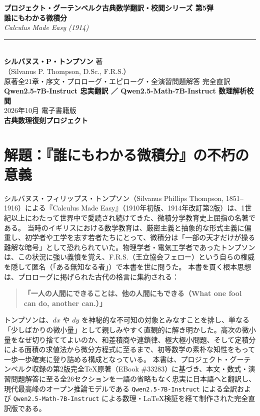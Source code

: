 \documentclass[a4paper,11pt,openany]{ltjsbook}
\begin{document}
\begin{titlepage}
    \centering
    \vspace*{25mm}
    {\fontsize{14}{20}\selectfont \textbf{プロジェクト・グーテンベルク古典数学翻訳・校閲シリーズ 第5弾}}\\[8mm]
    {\fontsize{28}{36}\selectfont \textbf{誰にもわかる微積分}}\\[4mm]
    {\fontsize{16}{22}\selectfont \textit{Calculus Made Easy (1914)}}\\[12mm]
    \rule{0.85\textwidth}{1.5pt}\\[10mm]
    {\fontsize{15}{22}\selectfont \textbf{シルバヌス・P・トンプソン} 著}\\[3mm]
    {\fontsize{12}{18}\selectfont （Silvanus P. Thompson, D.Sc., F.R.S.）}\\[8mm]
    {\fontsize{13}{19}\selectfont 原著全21章・序文・プロローグ・エピローグ・全演習問題解答 完全直訳}\\[2mm]
    {\fontsize{11}{16}\selectfont \textbf{Qwen2.5-7B-Instruct 忠実翻訳 ／ Qwen2.5-Math-7B-Instruct 数理解析校閲}}\\[25mm]
    \vfill
    {\fontsize{11}{16}\selectfont 2026年10月 電子書籍版}\\[2mm]
    {\fontsize{10}{14}\selectfont \textbf{古典数理復刻プロジェクト}}\\[15mm]
\end{titlepage}
\frontmatter
\chapter*{解題：『誰にもわかる微積分』の不朽の意義}
シルバヌス・フィリップス・トンプソン（Silvanus Phillips Thompson, 1851--1916）による『Calculus Made Easy』（1910年初版、1914年改訂第2版）は、1世紀以上にわたって世界中で愛読され続けてきた、微積分学教育史上屈指の名著である。
当時のイギリスにおける数学教育は、厳密主義と抽象的な形式主義に偏重し、初学者や工学を志す若者たちにとって、微積分は「一部の天才だけが操る難解な暗号」として恐れられていた。物理学者・電気工学者であったトンプソンは、この状況に強い義憤を覚え、F.R.S.（王立協会フェロー）という自らの権威を隠して匿名（「ある無知なる者」）で本書を世に問うた。
本書を貫く根本思想は、プロローグに掲げられた古代の格言に集約される：
\begin{quote}
\textbf{「一人の人間にできることは、他の人間にもできる（What one fool can do, another can.）」}
\end{quote}
トンプソンは、$dx$ や $dy$ を神秘的な不可知の対象とみなすことを排し、単なる「少しばかりの微小量」として親しみやすく直観的に解き明かした。高次の微小量をなぜ切り捨ててよいのか、和差積商や連鎖律、極大極小問題、そして定積分による面積の求値法から微分方程式に至るまで、初等数学の素朴な知性をもって一歩一歩確実に登り詰める構成となっている。
本書は、プロジェクト・グーテンベルク収録の第2版完全TeX原著（EBook \#33283）に基づき、本文・数式・演習問題解答に至る全26セクションを一語の省略もなく忠実に日本語へと翻訳し、現代最高峰のオープン推論モデルである \texttt{Qwen2.5-7B-Instruct} による全訳および \texttt{Qwen2.5-Math-7B-Instruct} による数理・LaTeX検証を経て制作された完全直訳版である。
\tableofcontents
\mainmatter
\end{document}
